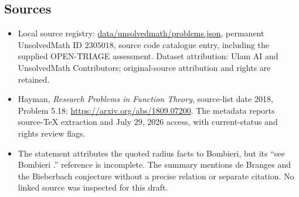 \documentclass[11pt]{article}
\begin{document}
\subsection{Sources}
\begin{itemize}
\item Local source registry: \url{data/unsolvedmath/problems.json}, permanent UnsolvedMath ID $2305018$, source code catalogue entry, including the supplied OPEN-TRIAGE assessment. Dataset attribution: Ulam AI and UnsolvedMath Contributors; original-source attribution and rights are retained.
\item Hayman, \emph{Research Problems in Function Theory}, source-list date 2018, Problem 5.18: \url{https://arxiv.org/abs/1809.07200}. The metadata reports source-TeX extraction and July 29, 2026 access, with current-status and rights review flags.
\item The statement attributes the quoted radius facts to Bombieri, but its ``see Bombieri .'' reference is incomplete. The summary mentions de Branges and the Bieberbach conjecture without a precise relation or separate citation. No linked source was inspected for this draft.
\end{itemize}
\end{document}
